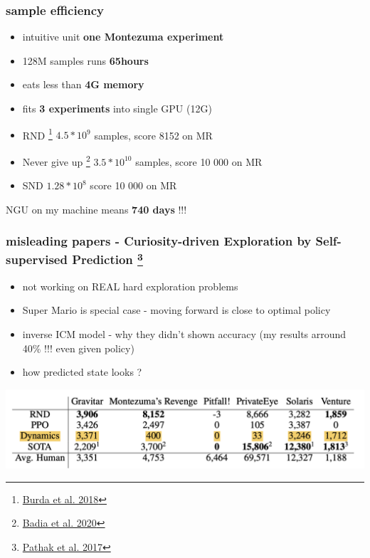 \documentclass{beamer}
\begin{document}
\begin{frame}
  
  \frametitle{sample efficiency}

  \begin{itemize}
    \item intuitive unit {\bf one Montezuma experiment}
    \item 128M samples runs {\bf 65hours}
    \item eats less than {\bf 4G memory}
    \item fits {\bf 3 experiments} into single GPU (12G)
  \end{itemize}

  \bigskip

  \begin{itemize}
    \item RND \footnote{\href{https://arxiv.org/pdf/1810.12894.pdf}{Burda et al. 2018}} $4.5*10^9$ samples, score 8152 on MR
    \item Never give up \footnote{\href{https://arxiv.org/pdf/2002.06038.pdf}{Badia et al. 2020}} $3.5*10^{10}$ samples, score 10 000 on MR
    \item SND $1.28*10^8$ score 10 000 on MR 
  \end{itemize}

  NGU on my machine means {\bf 740 days} !!!
\end{frame}


\begin{frame}
  
  \frametitle{misleading papers - Curiosity-driven Exploration by Self-supervised Prediction \footnote{\href{https://arxiv.org/abs/1705.05363}{Pathak et al. 2017}}}
  
  \begin{itemize}
    \item not working on REAL hard exploration problems
    \item Super Mario is special case - moving forward is close to optimal policy
    \item inverse ICM model - why they didn't shown accuracy (my results arround 40\% !!! even given policy)
    \item how predicted state looks ?
  \end{itemize}

  \centering
  \includegraphics[scale=0.25]{../papers_captions/icm_a.png}

\end{frame}
\end{document}
